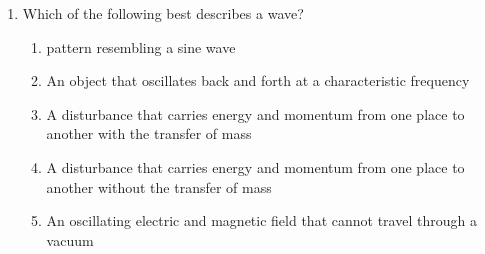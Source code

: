 \documentclass{../../../oss-classkick}
\begin{document}
\begin{multicols}{2}
\begin{enumerate}[leftmargin=18pt,resume]
  \item Which of the following best describes a wave?
    \begin{enumerate}[nosep,leftmargin=18pt,label=(\Alph*)]
    \item pattern resembling a sine wave
    \item An object that oscillates back and forth at a characteristic frequency
    \item A disturbance that carries energy and momentum from one place to
      another with the transfer of mass
    \item A disturbance that carries energy and momentum from one place to
      another without the transfer of mass
    \item An oscillating electric and magnetic field that cannot travel through
      a vacuum
    \end{enumerate}
    
    
    


\end{enumerate}
\end{multicols}
\end{document}
